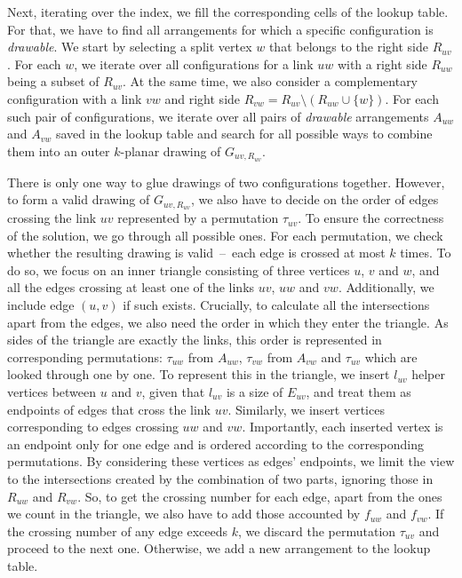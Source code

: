 Next, iterating over the index, we fill the corresponding cells of the lookup table. For that, we have to find all arrangements for which a specific configuration is \emph{drawable}. We start by selecting a split vertex \(w\) that belongs to the right side \(R_{uv}\). For each \(w\), we iterate over all configurations for a link \(uw\) with a right side \(R_{uw}\) being a subset of \(R_{uv}\). At the same time, we also consider a complementary configuration with a link \(vw\) and right side \(R_{vw} = R_{uv} \setminus (R_{uw} \cup \{w\})\). For each such pair of configurations, we iterate over all pairs of \emph{drawable} arrangements \(A_{uw}\) and \(A_{vw}\) saved in the lookup table and search for all possible ways to combine them into an outer \(k\)-planar drawing of \(G_{uv, R_{uv}}\).

There is only one way to glue drawings of two configurations together. However, to form a valid drawing of \(G_{uv, R_{uv}}\), we also have to decide on the order of edges crossing the link \(uv\) represented by a permutation \(\tau_{uv}\). To ensure the correctness of the solution, we go through all possible ones. For each permutation, we check whether the resulting drawing is valid~--~each edge is crossed at most \(k\) times. To do so, we focus on an inner triangle consisting of three vertices \(u\), \(v\) and \(w\), and all the edges crossing at least one of the links \(uv\), \(uw\) and \(vw\). Additionally, we include edge \((u, v)\) if such exists. Crucially, to calculate all the intersections apart from the edges, we also need the order in which they enter the triangle. As sides of the triangle are exactly the links, this order is represented in corresponding permutations: \(\tau_{uw}\) from \(A_{uw}\), \(\tau_{vw}\) from \(A_{vw}\) and \(\tau_{uv}\) which are looked through one by one. To represent this in the triangle, we insert \(l_{uv}\) helper vertices between \(u\) and \(v\), given that \(l_{uv}\) is a size of \(E_{uv}\), and treat them as endpoints of edges that cross the link \(uv\). Similarly, we insert vertices corresponding to edges crossing \(uw\) and \(vw\). Importantly, each inserted vertex is an endpoint only for one edge and is ordered according to the corresponding permutations. By considering these vertices as edges' endpoints, we limit the view to the intersections created by the combination of two parts, ignoring those in \(R_{uw}\) and \(R_{vw}\). So, to get the crossing number for each edge, apart from the ones we count in the triangle, we also have to add those accounted by \(f_{uw}\) and \(f_{vw}\). If the crossing number of any edge exceeds \(k\), we discard the permutation \(\tau_{uv}\) and proceed to the next one. Otherwise, we add a new arrangement to the lookup table.

